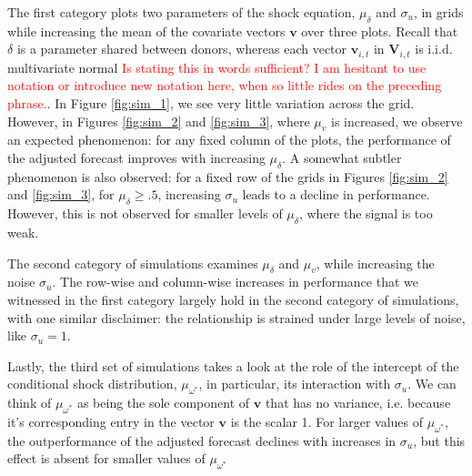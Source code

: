\documentclass[11pt,3p,review,authoryear]{elsarticle}
\newcommand{\x}{\textbf{v}}
\newcommand{\V}{\textbf{V}}
\theoremstyle{definition}
\begin{document}
The first category plots two parameters of the shock equation, $\mu_{\delta}$ and $\sigma_{u}$, in grids while increasing the mean of the covariate vectors $\x$ over three plots.  Recall that $\delta$ is a parameter shared between donors, whereas each vector $\x_{i,t}$ in $\V_{i,t}$ is i.i.d. multivariate normal \textcolor{red}{Is stating this in words sufficient?  I am hesitant to use notation or introduce new notation here, when so little rides on the preceding phrase.}.  In Figure \ref{fig:sim_1}, we see very little variation across the grid.  However, in Figures \ref{fig:sim_2} and \ref{fig:sim_3}, where $\mu_{v}$ is increased, we observe an expected phenomenon: for any fixed column of the plots, the performance of the adjusted forecast improves with increasing $\mu_{\delta}$.  A somewhat subtler phenomenon is also observed: for a fixed row of the grids in Figures \ref{fig:sim_2} and \ref{fig:sim_3}, for $\mu_{\delta} \geq .5$, increasing $\sigma_{u}$ leads to a decline in performance.  However, this is not observed for smaller levels of $\mu_{\delta}$, where the signal is too weak.

The second category of simulations examines $\mu_{\delta}$ and $\mu_{v}$, while increasing the noise $\sigma_{u}$.  The row-wise and column-wise increases in performance that we witnessed in the first category largely hold in the second category of simulations, with one similar disclaimer: the relationship is strained under large levels of noise, like $\sigma_{u} = 1$.


Lastly, the third set of simulations takes a look at the role of the intercept of the conditional shock distribution, $\mu_{\omega^{*}}$, in particular, its interaction with $\sigma_{u}$.  We can think of $\mu_{\omega^{*}}$ as being the sole component of $\x$ that has no variance, i.e. because it's corresponding entry in the vector $\x$ is the scalar 1.  For larger values of $\mu_{\omega^{*}}$, the outperformance of the adjusted forecast declines with increases in $\sigma_{u}$, but this effect is absent for smaller values of $\mu_{\omega^{*}}$ 
\end{document}
